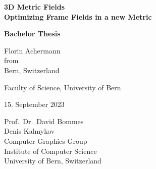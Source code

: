 \documentclass[a4paper,twoside,openright,11pt]{report}
\newcommand{\thesistitle}{3D Metric Fields}
\newcommand{\thesisauthor}{Florin Achermann}
\newcommand{\thesisauthororigin}{Bern, Switzerland}
\newcommand{\thesisleiter}{Prof.\ Dr.\ David Bommes}
\newcommand{\thesisasst}{Denis Kalmykov}
\newcommand{\thesissubtitle}{Optimizing Frame Fields in a new Metric}
\newcommand{\thesisdate}{15. September 2023}
\begin{document}

\begin{titlepage}  
  \thispagestyle{empty}

  \begin{center}  
    \begin{figure}[t]  
      \vspace{1in}     
    \end{figure}
    
    {\bfseries\Huge \thesistitle \\[2mm]
      \Large \thesissubtitle}\\
    \vspace{1.5cm}

    {\bfseries\LARGE Bachelor Thesis}\\
    \vspace{1.5cm}
    
    {\Large \thesisauthor\\[2mm]
      from\\[2mm]
      \thesisauthororigin}\\
    \vspace{1.5cm}

    {\Large Faculty of Science, University of Bern}\\
    \vspace{1.5cm}

    {\Large \thesisdate}\\
    \vspace{1.5cm}

    \vspace*{\fill}
    {\Large
      \thesisleiter\\
      \thesisasst\\
      Computer Graphics Group\\
      Institute of Computer Science\\
      University of Bern, Switzerland\\}
  \end{center}
\end{titlepage}
\end{document}
